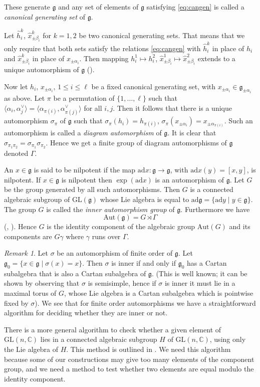 \documentclass[a4paper,10pt]{amsart}
\newcommand{\C}{\mathbb{C}}
\newcommand{\GL}{\mathrm{GL}}
\newcommand{\mf}{\mathfrak}
\newcommand{\g}{\mf{g}}
\newcommand{\ad}{\mathrm{ad}}
\newcommand{\Aut}{\mathrm{Aut}}
\numberwithin{equation}{section}
\theoremstyle{remark}
\theoremstyle{remark}
\newtheorem{rmk}[theorem]{Remark}
\begin{document}
These generate $\g$ and any set of elements of $\g$ satisfying
\eqref{eq:cangen} is called a {\em canonical generating set} of $\g$.

Let $\hat h_i^k$, $\hat x_{\pm\beta_i}^k$ for $k=1,2$ be two canonical generating
sets. That means that we only require that both sets satisfy the relations
\eqref{eq:cangen} with $\hat h_i^k$ in place of $h_i$ and $\hat x_{\pm \beta_i}^k$
in place of $x_{\pm\alpha_i}$. Then mapping $h_i^1 \mapsto h_i^2$,
$\hat x_{\pm\beta_i}^1\mapsto
\hat x_{\pm\beta_i}^2$ extends to a unique automorphism of $\g$
(\cite[Chapter IV, Theorem 3]{jac}).

Now let $h_i$, $x_{\pm\alpha_i}$, $1\leq i\leq \ell$ be a fixed canonical
generating set, with $x_{\pm\alpha_i}\in \g_{\pm\alpha_i}$ as above. 
Let $\pi$ be a permutation of
$\{1,\ldots,\ell\}$ such that $\langle \alpha_i,\alpha_j^\vee\rangle =
\langle \alpha_{\pi(i)},\alpha_{\pi(j)}^\vee\rangle$ for all $i,j$. Then
it follows that there is a unique automorphism $\sigma_{\pi}$ of
$\g$ such that $\sigma_\pi(h_i) = h_{\pi(i)}$, $\sigma_\pi(x_{\pm\alpha_i})
= x_{\pm \alpha_{\pi(i)}}$. Such an automorphism is called a {\em diagram
automorphism} of $\g$. It is clear that $\sigma_{\pi_1\pi_2}= \sigma_{\pi_1}
\sigma_{\pi_2}$. Hence we get a finite group of diagram automorphisms of $\g$
denoted $\Gamma$.

An $x\in \g$ is said to be nilpotent if the map $\ad x : \g\to\g$, with
$\ad x(y) =[x,y]$, is nilpotent. If $x\in \g$ is nilpotent then $\exp(\ad x)$
is an automorphism of $\g$. Let $G$ be the group generated by all such
automorphisms. Then $G$ is a connected algebraic subgroup of $\GL(\g)$ whose
Lie algebra is equal to $\ad \g =\{ \ad y\mid y\in \g\}$. The group $G$ is
called the {\em inner automorphism group} of $\g$. Furthermore we have
$$\Aut(\g) = G\rtimes \Gamma$$
(\cite[\S IX.4]{jac}, \cite[\S 4, Theorem 1]{onishchik}). Hence $G$ is the
identity component of the algebraic group $\Aut(G)$ and its components are
$G\gamma$ where $\gamma$ runs over $\Gamma$.

\begin{rmk}\label{rem:outer}
Let $\sigma$ be an automorphism of finite order of $\g$. Let
$\g_0 = \{ x\in \g\mid \sigma(x)=x\}$. Then $\sigma$ is inner if and only
if $\g_0$ has a Cartan subalgebra that is also a Cartan subalgebra of $\g$.
(This is well known; it can be shown by observing that $\sigma$ is semisimple,
hence if $\sigma$ is inner it must lie in a maximal torus of $G$, whose Lie algebra
is a Cartan subalgebra which is pointwise fixed by $\sigma$).
We see that for finite order automorphisms we have a
straightforward algorithm for deciding whether they are inner or not.

There is a more general algorithm to check whether a given element of
$\GL(n,\C)$ lies in a connected algebraic subgroup $H$ of $\GL(n,\C)$,
using only the Lie algebra of $H$. This method is outlined in
\cite[Remark 5.8]{borwdg}. We need this algorithm because some of our
constructions may give too many elements of the component group, and we need
a method
to test whether two elements are equal modulo the identity component.
\end{rmk}  
\end{document}
